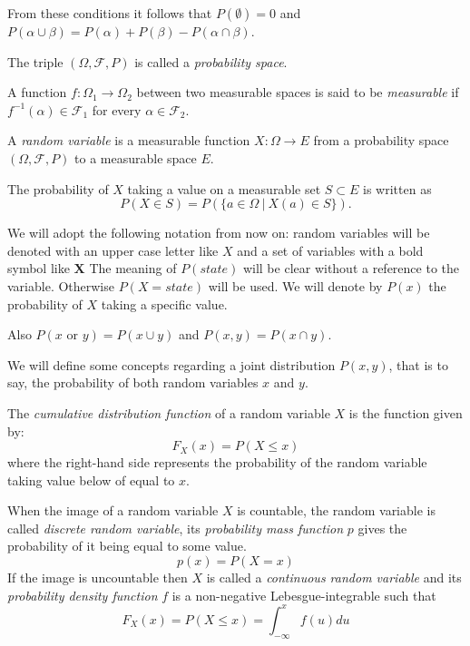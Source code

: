 From these conditions it follows that \(P(\emptyset) = 0\) and \(P(\alpha \cup \beta)
= P(\alpha) + P(\beta) - P(\alpha \cap \beta)\).

The triple \((\Omega, \mathcal{F}, P)\) is called a \emph{probability space}.

\begin{definition}
A function \(f:\Omega_1 \to \Omega_2\) between two
measurable spaces is said to be \emph{measurable} if \(f^{-1}(\alpha) \in \mathcal{F}_1\) for every \(\alpha \in \mathcal{F}_2\).
\end{definition}

\begin{definition}
A \emph{random variable} is a measurable function \(X:\Omega \to E\) from a probability
space \((\Omega, \mathcal{F}, P)\) to a measurable space \(E\).

The probability of \(X\) taking a value on a measurable set \(S \subset E\) is
written as
\[
P(X \in S) = P(\{a \in \Omega \ | \ X(a) \in S \}).
\]
\end{definition}

We will adopt the following notation from now on: random variables will be
denoted with an upper case letter like \(X\) and a set of variables with a
bold symbol like \(\bm{X}\) The meaning of \(P(state)\) will be clear without a reference to the variable.
Otherwise \(P(X = state)\) will be used.
We will denote by \(P(x)\) the probability of \(X\) taking a specific value.

Also \(P(x \text{ or } y) = P(x \cup y)\) and \(P(x,y) = P(x \cap y)\).

We will define some concepts regarding a joint distribution \(P(x,y)\), that is
to say, the probability of both random variables \(x\) and \(y\).

\begin{definition}
The \emph{cumulative distribution function} of a random variable \(X\) is the
function given by:
\[
F_X (x) = P(X \leq x)
\]
where the right-hand side represents the probability of the random variable
taking value below of equal to \(x\).
\end{definition}

\begin{definition}
When the image of a random variable \(X\) is countable, the random variable is called
\emph{discrete random variable}, its \emph{probability mass function} \(p\) gives the
probability of it being equal to some value.
\[
p(x) = P(X = x)
\]
If the image is uncountable then \(X\) is called a \emph{continuous random
  variable} and its \emph{probability density function} \(f\) is a non-negative
Lebesgue-integrable such that
\[
F_X(x) = P(X \leq x) = \int_{-\infty}^x f(u) du
\]
\end{definition}

